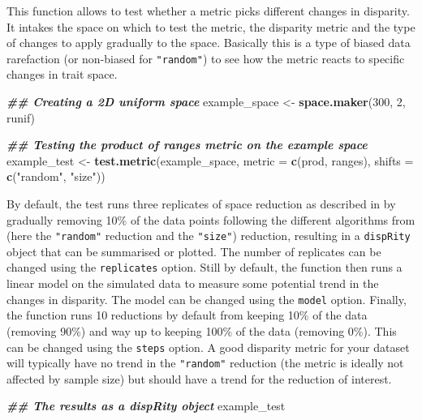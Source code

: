 \documentclass[
]{book}
\newenvironment{Shaded}{\begin{snugshade}}{\end{snugshade}}
\newcommand{\AttributeTok}[1]{\textcolor[rgb]{0.13,0.29,0.53}{#1}}
\newcommand{\DecValTok}[1]{\textcolor[rgb]{0.00,0.00,0.81}{#1}}
\newcommand{\DocumentationTok}[1]{\textcolor[rgb]{0.56,0.35,0.01}{\textbf{\textit{#1}}}}
\newcommand{\FunctionTok}[1]{\textcolor[rgb]{0.13,0.29,0.53}{\textbf{#1}}}
\newcommand{\NormalTok}[1]{#1}
\newcommand{\OtherTok}[1]{\textcolor[rgb]{0.56,0.35,0.01}{#1}}
\newcommand{\StringTok}[1]{\textcolor[rgb]{0.31,0.60,0.02}{#1}}
\begin{document}
This function allows to test whether a metric picks different changes in disparity. It intakes the space on which to test the metric, the disparity metric and the type of changes to apply gradually to the space.
Basically this is a type of biased data rarefaction (or non-biased for \texttt{"random"}) to see how the metric reacts to specific changes in trait space.

\begin{Shaded}
\begin{Highlighting}[]
\DocumentationTok{\#\# Creating a 2D uniform space}
\NormalTok{example\_space }\OtherTok{\textless{}{-}} \FunctionTok{space.maker}\NormalTok{(}\DecValTok{300}\NormalTok{, }\DecValTok{2}\NormalTok{, runif)}

\DocumentationTok{\#\# Testing the product of ranges metric on the example space}
\NormalTok{example\_test }\OtherTok{\textless{}{-}} \FunctionTok{test.metric}\NormalTok{(example\_space, }\AttributeTok{metric =} \FunctionTok{c}\NormalTok{(prod, ranges),}
                           \AttributeTok{shifts =} \FunctionTok{c}\NormalTok{(}\StringTok{"random"}\NormalTok{, }\StringTok{"size"}\NormalTok{)) }
\end{Highlighting}
\end{Shaded}

By default, the test runs three replicates of space reduction as described in \citet{moms} by gradually removing 10\% of the data points following the different algorithms from \citet{moms} (here the \texttt{"random"} reduction and the \texttt{"size"}) reduction, resulting in a \texttt{dispRity} object that can be summarised or plotted.
The number of replicates can be changed using the \texttt{replicates} option.
Still by default, the function then runs a linear model on the simulated data to measure some potential trend in the changes in disparity.
The model can be changed using the \texttt{model} option.
Finally, the function runs 10 reductions by default from keeping 10\% of the data (removing 90\%) and way up to keeping 100\% of the data (removing 0\%).
This can be changed using the \texttt{steps} option.
A good disparity metric for your dataset will typically have no trend in the \texttt{"random"} reduction (the metric is ideally not affected by sample size) but should have a trend for the reduction of interest.

\begin{Shaded}
\begin{Highlighting}[]
\DocumentationTok{\#\# The results as a dispRity object}
\NormalTok{example\_test}
\end{Highlighting}
\end{Shaded}
\end{document}
